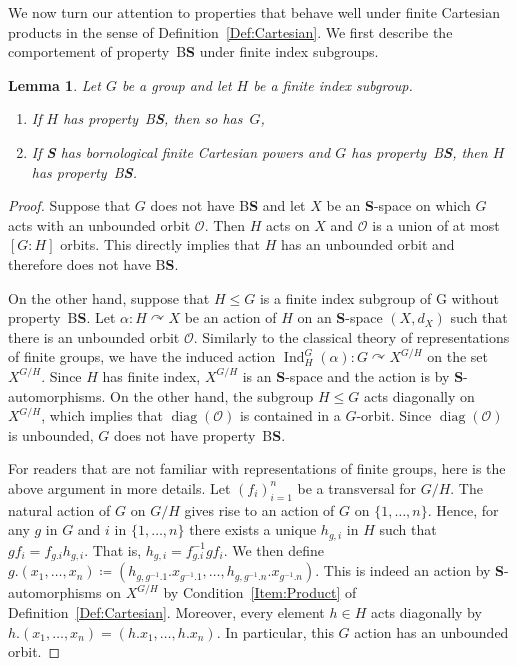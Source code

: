 \documentclass[a4paper]{article}
\newtheorem{lem}{Lemma}[section]
\theoremstyle{definition}
\DeclareMathOperator\Ind{Ind}
\DeclareMathOperator\diag{diag}
\newcommand*{\orbite}{\mathcal O}
\newcommand*{\category}[1]{\textbf{#1}}
\newcommand*{\CatS}{\category{S}}
\newcommand*{\BS}{B\textbf{S}}
\begin{document}
We now turn our attention to properties that behave well under finite Cartesian products in the sense of Definition~\ref{Def:Cartesian}.
We first describe the comportement of property~\BS{} under finite index subgroups.
%
%
\begin{lem}\label{Lemma:Subgroup}
Let $G$ be a group and let $H$ be a finite index subgroup.
\begin{enumerate}
\item
If $H$ has property~\BS, then so has~$G$,
\item
If \CatS{} has bornological finite Cartesian powers and $G$ has property~\BS, then $H$ has property~\BS.
\end{enumerate}
\end{lem}
\begin{proof}
Suppose that $G$ does not have \BS{} and let $X$ be an \CatS-space on which $G$ acts with an unbounded orbit $\orbite$.
Then $H$ acts on $X$ and $\orbite$ is a union of at most $[G:H]$ orbits. This directly implies that $H$ has an unbounded orbit and therefore does not have \BS.

On the other hand, suppose that $H\leq G$ is a finite index subgroup of G without property~\BS.
Let $\alpha\colon H\curvearrowright X$ be an action of $H$ on an \CatS-space $(X,d_X)$ such that there is an unbounded orbit $\orbite$.
Similarly to the classical theory of representations of finite groups, we have the induced  action $\Ind_H^G(\alpha)\colon G \curvearrowright X^{G/H}$ on the set $X^{G/H}$. Since $H$ has finite index, $X^{G/H}$ is an \CatS-space and the action is by \CatS-automorphisms. On the other hand, the subgroup $H\leq G$ acts diagonally on $X^{G/H}$, which implies that $\diag(\orbite)$ is contained in a $G$-orbit.
Since $\diag(\orbite)$ is unbounded, $G$ does not have property~\BS.

For readers that are not familiar with representations of finite groups, here is the above argument in more details.
Let $(f_i)_{i=1}^n$ be a transversal for $G/H$.
The natural action of $G$ on $G/H$ gives rise to an action of $G$ on $\{1,\dots,n\}$.
Hence, for any $g$ in $G$ and $i$ in $\{1,\dots,n\}$ there exists a unique $h_{g,i}$ in $H$ such that $gf_i=f_{g.i}h_{g,i}$. That is, $h_{g,i}=f_{g.i}^{-1}gf_i$.
We then define $g.(x_1,\dots,x_n)\coloneqq(h_{g,g^{-1}.1}.x_{g^{-1}.1},\dots,h_{g,g^{-1}.n}.x_{g^{-1}.n})$. This is indeed an action by \CatS-auto\-mor\-phisms on $X^{G/H}$ by Condition~\ref{Item:Product} of Definition~\ref{Def:Cartesian}.
Moreover, every element $h\in H$ acts diagonally by $h.(x_1,\dots,x_n)=(h.x_1,\dots,h.x_n)$.
In particular, this $G$ action has an unbounded orbit.
\end{proof}
\end{document}

